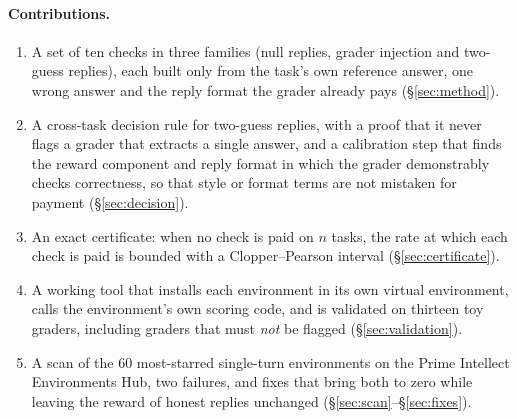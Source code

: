 \paragraph{Contributions.}
\begin{enumerate}
  \item A set of ten checks in three families (null replies, grader injection and two-guess replies), each built only from the task's own reference answer, one wrong answer and the reply format the grader already pays (\S\ref{sec:method}).
  \item A cross-task decision rule for two-guess replies, with a proof that it never flags a grader that extracts a single answer, and a calibration step that finds the reward component and reply format in which the grader demonstrably checks correctness, so that style or format terms are not mistaken for payment (\S\ref{sec:decision}).
  \item An exact certificate: when no check is paid on $n$ tasks, the rate at which each check is paid is bounded with a Clopper--Pearson interval (\S\ref{sec:certificate}).
  \item A working tool that installs each environment in its own virtual environment, calls the environment's own scoring code, and is validated on thirteen toy graders, including graders that must \emph{not} be flagged (\S\ref{sec:validation}).
  \item A scan of the 60 most-starred single-turn environments on the Prime Intellect Environments Hub, two failures, and fixes that bring both to zero while leaving the reward of honest replies unchanged (\S\ref{sec:scan}--\S\ref{sec:fixes}).
\end{enumerate}

